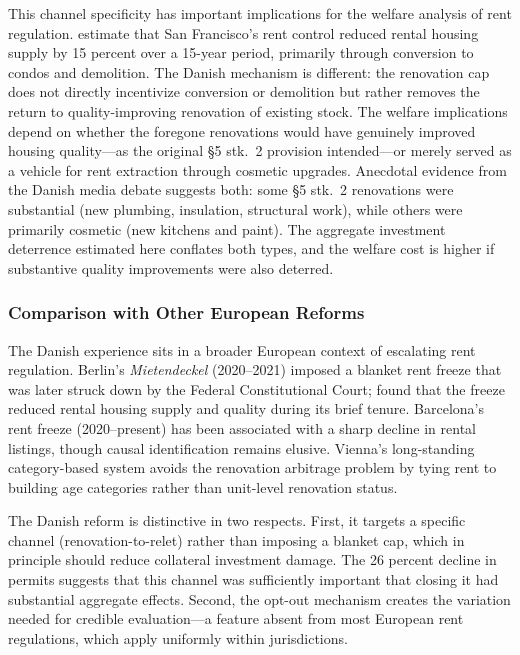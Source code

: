 \documentclass[12pt]{article}
\begin{document}
This channel specificity has important implications for the welfare analysis of rent regulation. \citet{diamond2019} estimate that San Francisco's rent control reduced rental housing supply by 15 percent over a 15-year period, primarily through conversion to condos and demolition. The Danish mechanism is different: the renovation cap does not directly incentivize conversion or demolition but rather removes the return to quality-improving renovation of existing stock. The welfare implications depend on whether the foregone renovations would have genuinely improved housing quality---as the original \S5 stk.\ 2 provision intended---or merely served as a vehicle for rent extraction through cosmetic upgrades. Anecdotal evidence from the Danish media debate suggests both: some \S5 stk.\ 2 renovations were substantial (new plumbing, insulation, structural work), while others were primarily cosmetic (new kitchens and paint). The aggregate investment deterrence estimated here conflates both types, and the welfare cost is higher if substantive quality improvements were also deterred.

\subsubsection*{Comparison with Other European Reforms} The Danish experience sits in a broader European context of escalating rent regulation. Berlin's \emph{Mietendeckel} (2020--2021) imposed a blanket rent freeze that was later struck down by the Federal Constitutional Court; \citet{breidenbach2022} found that the freeze reduced rental housing supply and quality during its brief tenure. Barcelona's rent freeze (2020--present) has been associated with a sharp decline in rental listings, though causal identification remains elusive. Vienna's long-standing category-based system avoids the renovation arbitrage problem by tying rent to building age categories rather than unit-level renovation status.

The Danish reform is distinctive in two respects. First, it targets a specific channel (renovation-to-relet) rather than imposing a blanket cap, which in principle should reduce collateral investment damage. The 26 percent decline in permits suggests that this channel was sufficiently important that closing it had substantial aggregate effects. Second, the opt-out mechanism creates the variation needed for credible evaluation---a feature absent from most European rent regulations, which apply uniformly within jurisdictions.
\end{document}
